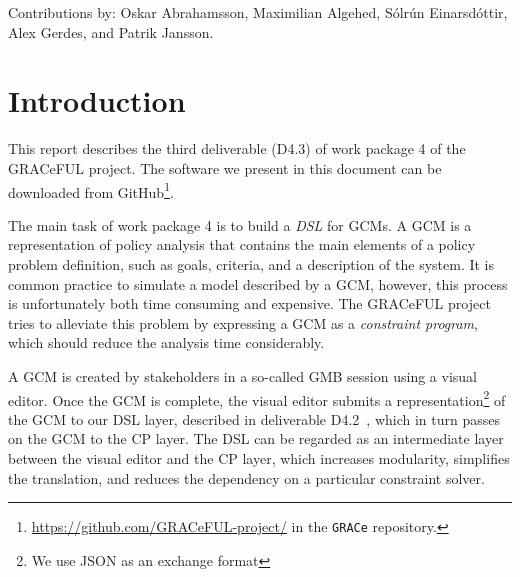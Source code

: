 \documentclass{article}
\newcommand{\grace}{GRACeFUL\xspace}
\begin{document}
Contributions by: Oskar Abrahamsson, Maximilian Algehed, Sólrún
Einarsdóttir, Alex Gerdes, and Patrik Jansson.

\begin{abstract}

This third deliverable (D4.3) of work package 4 presents the
translation of GRACeFUL concept maps (expressed as GRACe programs) to
the Constraint Functional Programming (CFP) layer.
%
This report builds on the description of GRACe in ``D4.2: A Domain
Specific Language (DSL) for GRACeFUL Concept Maps'' (delivered in
project month 24) and the third release of the CFP layer ``haskelzinc''.
%
(The first release was described in ``D5.1: Domain-Specific Language
for the Constraint Functional Programming Platform'' and the latest
version is available from the Haskell package repository
\href{https://hackage.haskell.org/package/haskelzinc}{Hackage}.)
%
The work leading up to this deliverable is within Task 4.4 ``implement
a middleware for connecting the DSL to the CFP layer'' and the full
source code of the implementation is available on GitHub.


\end{abstract}

\vfill

\setcounter{tocdepth}{2}
\tableofcontents

\vfill


\newpage

\section{Introduction}

This report describes the third deliverable (D4.3) of work package 4
of the \grace project. The software we present in this document can be
downloaded from
GitHub\footnote{\url{https://github.com/GRACeFUL-project/} in the
  \texttt{GRACe} repository.}.

The main task of work package 4 is to build a \emph{\ac{DSL}} for \acp{GCM}. A
\ac{GCM} is a representation of policy analysis that contains the main elements
of a policy problem definition, such as goals, criteria, and a description of
the system. It is common practice to simulate a model described by a \ac{GCM},
however, this process is unfortunately both time consuming and expensive. The
\grace project tries to alleviate this problem by expressing a \ac{GCM} as a
\emph{constraint program}, which should reduce the analysis time considerably.

A \ac{GCM} is created by stakeholders in a so-called \ac{GMB} session using a
visual editor. Once the \ac{GCM} is complete, the visual editor submits a
representation\footnote{We use \ac{JSON} as an exchange format} of the \ac{GCM}
to our \ac{DSL} layer, described in deliverable D4.2~\cite{D4.2}, which in turn
passes on the \ac{GCM} to the \ac{CP} layer. The \ac{DSL} can be regarded as an
intermediate layer between the visual editor and the \ac{CP} layer, which
increases modularity, simplifies the translation, and reduces the dependency on a
particular constraint solver.
\end{document}
